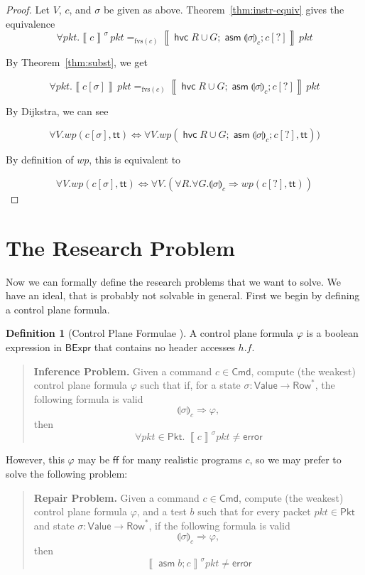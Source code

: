 \documentclass{article}
\newcommand{\pkt}{\mathit{pkt}}
\newcommand{\error}{\mathsf{error}}
\newcommand{\denote}[1]{\left\llbracket#1\right\rrbracket}
\newcommand{\TRUE}{\mathsf{tt}}
\newcommand{\FALSE}{\mathsf{ff}}
\newcommand{\Value}{\mathsf{Value}}
\newcommand{\BExpr}{\mathsf{BExpr}}
\newcommand{\Cmd}{\mathsf{Cmd}}
\newcommand{\Pkt}{\mathsf{Pkt}}
\newcommand{\Row}{\mathsf{Row}}
\newcommand{\assume}{\mathop{\mathsf{asm}}}
\newcommand{\havoc}[1]{\mathop{\mathsf{hvc}}#1}
\newcommand{\WP}{\textit{wp}}
\newcommand{\state}[1]{\llparenthesis#1\rrparenthesis}
\newcommand{\instr}{[?]}
\newcommand{\fvs}{\textrm{fvs}}
\theoremstyle{plain}
\theoremstyle{definition}
\newtheorem{definition}{Definition}
\theoremstyle{remark}
\begin{document}
\begin{proof}
  Let $V$, $c$, and $\sigma$ be given as above.
  Theorem~\ref{thm:instr-equiv} gives the equivalence
  \[\forall \pkt. \denote{c}^\sigma\,\pkt =_{\fvs(c)} \denote{\havoc{R \cup G}; \assume{\state\sigma_c}; c\instr}\,\pkt\]

  By Theorem~\ref{thm:subst}, we get

  \[\forall \pkt.\denote{c[\sigma]}\,\pkt =_{\fvs(c)}  \denote{\havoc{R \cup G}; \assume{\state\sigma_c}; c\instr}\,\pkt\]

  By Dijkstra, we can see

  \[\forall V. \WP(c[\sigma], \TRUE) \iff \forall V. \WP(\havoc{R \cup G}; \assume{\state\sigma_c}; c\instr, \TRUE))\]

  By definition of $\WP$, this is equivalent to

  \[ \forall V. \WP(c[\sigma],\TRUE) \iff \forall V. \left(\forall R.\forall G.\state\sigma_c \Rightarrow \WP(c\instr, \TRUE)\right)\]

\end{proof}


\clearpage
\section{The Research Problem}

Now we can formally define the research problems that we want to solve. We have
an ideal, that is probably not solvable in general. First we begin by defining a control plane formula.

\begin{definition}[Control Plane Formulae ]
  A control plane formula $\varphi$ is a boolean expression in $\BExpr$ that
  contains no header accesses $h.f$.
\end{definition}

\begin{quote}
  \textbf{Inference Problem.} Given a command $c \in \Cmd$, compute (the
  weakest) control plane formula $\varphi$ such that if, for a state $\sigma :
  \Value \to \Row^*$, the following formula is valid \[\state\sigma_c
  \Rightarrow \varphi,\] then \[\forall \pkt \in \Pkt.~ \denote{c}^\sigma\pkt \neq \error \]
\end{quote}

However, this $\varphi$ may be $\FALSE$ for many realistic programs $c$, so we may
prefer to solve the following problem:

\begin{quote}
  \textbf{Repair Problem.} Given a command $c \in \Cmd$, compute (the weakest)
  control plane formula $\varphi$, and a test $b$ such that for every
  packet $\pkt \in \Pkt$ and state $\sigma : \Value \to \Row^*$, if the
  following formula is valid
  \[\state\sigma_c \Rightarrow \varphi,\]
  then \[\denote{\assume b; c}^\sigma\pkt \neq \error \]
\end{quote}
\end{document}
